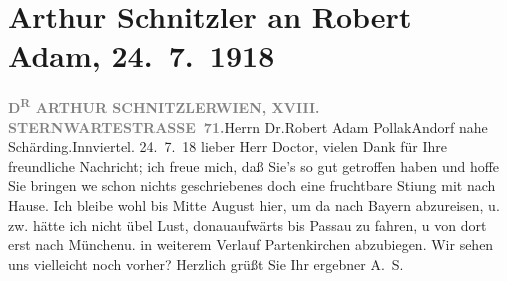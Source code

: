 

         
         \renewcommand{\erwaehntePersonen}{Personen: Robert Adam}
         \renewcommand{\erwaehnteOrte}{Orte: Andorf, Bayern, Innviertel, München, Partenkirchen, Passau, Sternwartestraße, Wien}
         \renewcommand{\erwaehnteWerke}{}
               \section[Arthur Schnitzler an Robert Adam, 24. 7. 1918]{ Arthur Schnitzler an Robert Adam, 24. 7. 1918}\nopagebreak{}\rehead{ }\begin{ledgroupsized}[t]{13cm}\normalsize\beginnumbering{} \toendnotes[C]{\smallbreak\pagebreak[2]} 
\pstart{}{\pb}\textcolor{gray}{\textbf{D\textsuperscript{R} ARTHUR SCHNITZLER}}\pend{}\pstart{}\textcolor{gray}{\textbf{WIEN, XVIII. STERNWARTESTRASSE 71.}}\pend{}{\bigskip}\pstart{}Herrn Dr.\pend{}\pstart{}Robert Adam Pollak\pend{}\pstart{}Andorf nahe Schärding.\pend{}\pstart{}Innviertel.\pend{}{\bigskip}\pstart
           \raggedleft{}{\pb}24. 7. 18\pend
           \pstart
           lieber Herr Doctor,  vielen Dank für Ihre freundliche Nachricht; ich
               freue mich, daß Sie’s so gut getroffen haben und hoffe Sie bringen we{\geminationn} schon nichts geschriebenes doch eine fruchtbare Sti{\geminationm}ung mit nach Hause. Ich bleibe wohl bis Mitte
                  August hier, um da{\geminationn} nach Bayern abzureisen, u. zw. hätte ich nicht übel Lust, donauaufwärts bis Passau zu fahren, u von dort erst nach Münchenu. in weiterem Verlauf Partenkirchen abzubiegen. Wir sehen uns vielleicht noch vorher? Herzlich
               grüßt Sie Ihr ergebner\pend
           \pstart \spacefill\mbox{A. S.}\pend{}
         
         \endnumbering{}\end{ledgroupsized}  \newcommand{\dateiname}{L02290}\newcommand{\titel}{Arthur Schnitzler an Robert Adam, 24. 7. 1918}\newcommand{\editorInnen}{Martin Anton Müller und Gerd-Hermann Susen}
      
